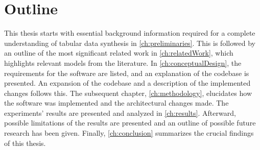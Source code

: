 \newpage
\section{Outline}
\label{ch:intro-outline}

This thesis starts with essential background information required for a complete understanding of tabular data synthesis in \autoref{ch:preliminaries}.
This is followed by an outline of the most significant related work in \autoref{ch:relatedWork}, which highlights relevant models from the literature.
In \autoref{ch:conceptualDesign}, the requirements for the software are listed, and an explanation of the codebase is presented. 
An expansion of the codebase and a description of the implemented changes follows this. 
The subsequent chapter, \autoref{ch:methodology}, elucidates how the software was implemented and the architectural changes made.
The experiments' results are presented and analyzed in \autoref{ch:results}. 
Afterward, possible limitations of the results are presented and an outline of possible future research has been given. 
Finally, \autoref{ch:conclusion} summarizes the crucial findings of this thesis.